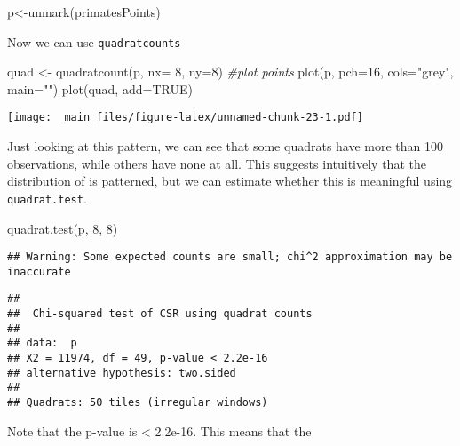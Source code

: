 \documentclass[
]{book}
\newenvironment{Shaded}{\begin{snugshade}}{\end{snugshade}}
\newcommand{\AttributeTok}[1]{\textcolor[rgb]{0.77,0.63,0.00}{#1}}
\newcommand{\CommentTok}[1]{\textcolor[rgb]{0.56,0.35,0.01}{\textit{#1}}}
\newcommand{\ConstantTok}[1]{\textcolor[rgb]{0.00,0.00,0.00}{#1}}
\newcommand{\DecValTok}[1]{\textcolor[rgb]{0.00,0.00,0.81}{#1}}
\newcommand{\FunctionTok}[1]{\textcolor[rgb]{0.00,0.00,0.00}{#1}}
\newcommand{\NormalTok}[1]{#1}
\newcommand{\OtherTok}[1]{\textcolor[rgb]{0.56,0.35,0.01}{#1}}
\newcommand{\StringTok}[1]{\textcolor[rgb]{0.31,0.60,0.02}{#1}}
\begin{document}
\begin{Shaded}
\begin{Highlighting}[]
\NormalTok{p}\OtherTok{\textless{}{-}}\FunctionTok{unmark}\NormalTok{(primatesPoints)}
\end{Highlighting}
\end{Shaded}

Now we can use \texttt{quadratcounts}

\begin{Shaded}
\begin{Highlighting}[]
\NormalTok{quad }\OtherTok{\textless{}{-}} \FunctionTok{quadratcount}\NormalTok{(p, }\AttributeTok{nx=} \DecValTok{8}\NormalTok{, }\AttributeTok{ny=}\DecValTok{8}\NormalTok{)}
\CommentTok{\#plot points}
\FunctionTok{plot}\NormalTok{(p, }\AttributeTok{pch=}\DecValTok{16}\NormalTok{, }\AttributeTok{cols=}\StringTok{"grey"}\NormalTok{, }\AttributeTok{main=}\StringTok{""}\NormalTok{) }
\FunctionTok{plot}\NormalTok{(quad, }\AttributeTok{add=}\ConstantTok{TRUE}\NormalTok{)  }
\end{Highlighting}
\end{Shaded}

\texttt{[image: \_main\_files/figure-latex/unnamed-chunk-23-1.pdf]}

Just looking at this pattern, we can see that some quadrats have more than 100 observations, while others have none at all. This suggests intuitively that the distribution of is patterned, but we can estimate whether this is meaningful using \texttt{quadrat.test}.

\begin{Shaded}
\begin{Highlighting}[]
\FunctionTok{quadrat.test}\NormalTok{(p, }\DecValTok{8}\NormalTok{, }\DecValTok{8}\NormalTok{)}
\end{Highlighting}
\end{Shaded}

\begin{verbatim}
## Warning: Some expected counts are small; chi^2 approximation may be inaccurate
\end{verbatim}

\begin{verbatim}
## 
##  Chi-squared test of CSR using quadrat counts
## 
## data:  p
## X2 = 11974, df = 49, p-value < 2.2e-16
## alternative hypothesis: two.sided
## 
## Quadrats: 50 tiles (irregular windows)
\end{verbatim}

Note that the p-value is \textless{} 2.2e-16. This means that the
\end{document}
